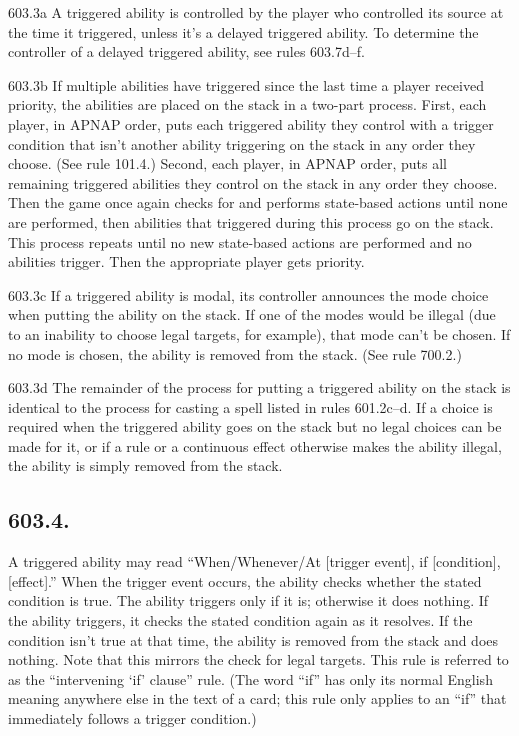 603.3a A triggered ability is controlled by the player who controlled its source at the time it triggered, unless it’s a delayed triggered ability. To determine the controller of a delayed triggered ability, see rules 603.7d–f.

603.3b If multiple abilities have triggered since the last time a player received priority, the abilities are placed on the stack in a two-part process. First, each player, in APNAP order, puts each triggered ability they control with a trigger condition that isn’t another ability triggering on the stack in any order they choose. (See rule 101.4.) Second, each player, in APNAP order, puts all remaining triggered abilities they control on the stack in any order they choose. Then the game once again checks for and performs state-based actions until none are performed, then abilities that triggered during this process go on the stack. This process repeats until no new state-based actions are performed and no abilities trigger. Then the appropriate player gets priority.

603.3c If a triggered ability is modal, its controller announces the mode choice when putting the ability on the stack. If one of the modes would be illegal (due to an inability to choose legal targets, for example), that mode can’t be chosen. If no mode is chosen, the ability is removed from the stack. (See rule 700.2.)

603.3d The remainder of the process for putting a triggered ability on the stack is identical to the process for casting a spell listed in rules 601.2c–d. If a choice is required when the triggered ability goes on the stack but no legal choices can be made for it, or if a rule or a continuous effect otherwise makes the ability illegal, the ability is simply removed from the stack.

\subsection*{603.4.}
A triggered ability may read “When/Whenever/At [trigger event], if [condition], [effect].” When the trigger event occurs, the ability checks whether the stated condition is true. The ability triggers only if it is; otherwise it does nothing. If the ability triggers, it checks the stated condition again as it resolves. If the condition isn’t true at that time, the ability is removed from the stack and does nothing. Note that this mirrors the check for legal targets. This rule is referred to as the “intervening ‘if’ clause” rule. (The word “if” has only its normal English meaning anywhere else in the text of a card; this rule only applies to an “if” that immediately follows a trigger condition.)

